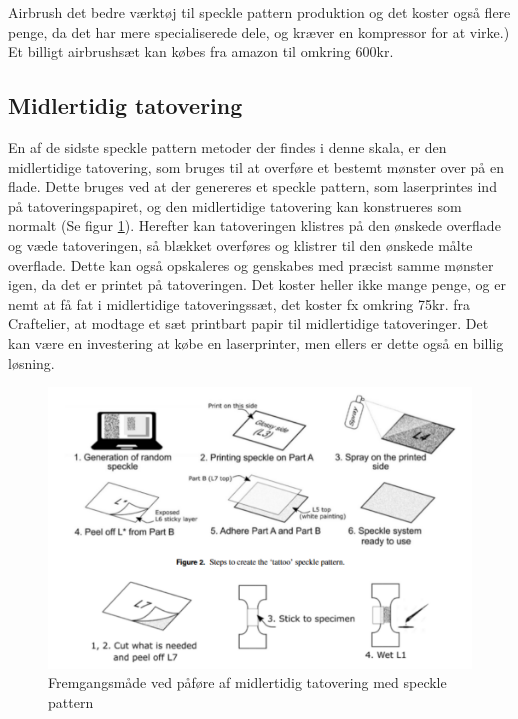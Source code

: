 Airbrush det bedre værktøj til speckle pattern produktion og det koster også flere penge, da det har mere specialiserede dele, og kræver en kompressor for at virke.\parencite{Dong2017ACorrelation}) Et billigt airbrushsæt kan købes fra amazon til omkring 600kr.\parencite{TIMBERTECH2025Amazon.comAirbrush}

\subsection{Midlertidig tatovering} En af de sidste speckle pattern metoder der findes i denne skala, er den midlertidige tatovering, som bruges til at overføre et bestemt mønster over på en flade. Dette bruges ved at der genereres et speckle pattern, som laserprintes ind på tatoveringspapiret, og den midlertidige tatovering kan konstrueres som normalt (Se figur \ref{Midlertidigtatovering}). Herefter kan tatoveringen klistres på den ønskede overflade og væde tatoveringen, så blækket overføres og klistrer til den ønskede målte overflade. Dette kan også opskaleres og genskabes med præcist samme mønster igen, da det er printet på tatoveringen. Det koster heller ikke mange penge, og er nemt at få fat i midlertidige tatoveringssæt, det koster fx omkring 75kr. fra Craftelier, at modtage et sæt printbart papir til midlertidige tatoveringer. \parencite{SilhouettePaper} Det kan være en investering at købe en laserprinter, men ellers er dette også en billig løsning.\parencite{Quino2021SpeckleEndurance}

\begin{figure}[H]
    \centering
    \includegraphics[width=1\linewidth]{Sections/2 Problemanalyse/Media/Temporary tattoo.png}
    \caption{Fremgangsmåde ved påføre af midlertidig tatovering med speckle pattern \parencite{Quino2021SpeckleEndurance}}
    \label{Midlertidigtatovering}
\end{figure}

